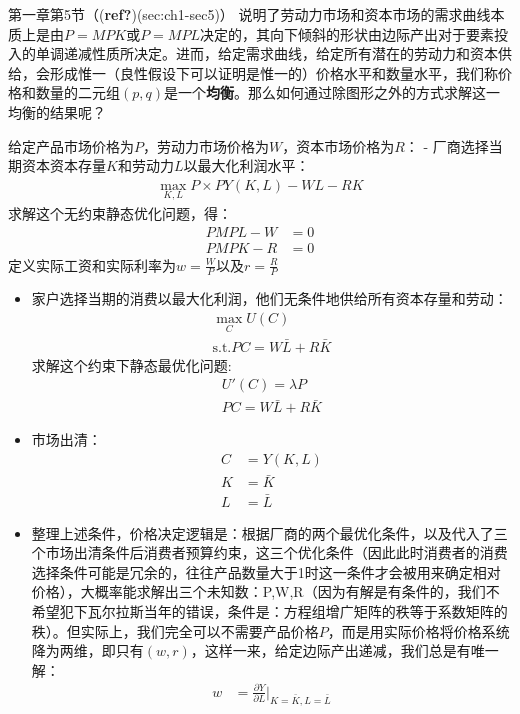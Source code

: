 \documentclass[
  11pt,
  letterpaper,
]{ctexbook}
\begin{document}
\begin{tcolorbox}[enhanced jigsaw, coltitle=black, bottomtitle=1mm, opacityback=0, toprule=.15mm, colbacktitle=quarto-callout-tip-color!10!white, breakable, arc=.35mm, left=2mm, rightrule=.15mm, toptitle=1mm, opacitybacktitle=0.6, titlerule=0mm, bottomrule=.15mm, colback=white, leftrule=.75mm, title=\textcolor{quarto-callout-tip-color}{\faLightbulb}\hspace{0.5em}{证明：为什么会按照边际产出进行分配？}, colframe=quarto-callout-tip-color-frame]

第一章第5节（(\textbf{ref?})(sec:ch1-sec5)）
说明了劳动力市场和资本市场的需求曲线本质上是由\(P= MPK\)或\(P = MPL\)决定的，其向下倾斜的形状由边际产出对于要素投入的单调递减性质所决定。进而，给定需求曲线，给定所有潜在的劳动力和资本供给，会形成惟一（良性假设下可以证明是惟一的）价格水平和数量水平，我们称价格和数量的二元组\((p,q)\)是一个\textbf{均衡}。那么如何通过除图形之外的方式求解这一均衡的结果呢？

给定产品市场价格为\(P\)，劳动力市场价格为\(W\)，资本市场价格为\(R\)： -
厂商选择当期资本资本存量\(K\)和劳动力\(L\)以最大化利润水平：
\begin{align}
    \max_{K,L} P \times PY(K,L) - W L - R K
    \end{align} 求解这个无约束静态优化问题，得： \begin{align}
        P MPL - W &= 0 \\
        P MPK - R &= 0 
    \end{align}
定义实际工资和实际利率为\(w = \frac{W}{P}\)以及\(r = \frac{R}{P}\)

\begin{itemize}
\item
  家户选择当期的消费以最大化利润，他们无条件地供给所有资本存量和劳动：
  \begin{align}
    \max_{C} U(C) \\
    \text{s.t.} P C = W \bar{L} + R \bar{K}
  \end{align} 求解这个约束下静态最优化问题: \begin{align}
  U'(C) = \lambda P \\
  P C = W \bar{L} + R \bar{K}
  \end{align}
\item
  市场出清： \begin{align}
  C &= Y(K,L) \\
  K &= \bar{K} \\
  L &= \bar{L}
  \end{align}
\item
  整理上述条件，价格决定逻辑是：根据厂商的两个最优化条件，以及代入了三个市场出清条件后消费者预算约束，这三个优化条件（因此此时消费者的消费选择条件可能是冗余的，往往产品数量大于1时这一条件才会被用来确定相对价格），大概率能求解出三个未知数：P,W,R（因为有解是有条件的，我们不希望犯下瓦尔拉斯当年的错误，条件是：方程组增广矩阵的秩等于系数矩阵的秩）。但实际上，我们完全可以不需要产品价格\(P\)，而是用实际价格将价格系统降为两维，即只有\((w,r)\)，这样一来，给定边际产出递减，我们总是有唯一解：
  \begin{align}
      w &= \frac{\partial Y}{\partial L}|_{K=\bar{K},L=\bar{L}} \\


\end{align}
\end{itemize}
\end{tcolorbox}
\end{document}
